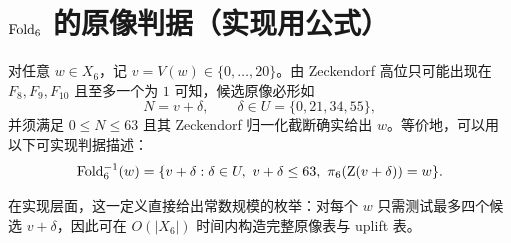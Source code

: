 
\section{$\mathrm{Fold}_6$ 的原像判据（实现用公式）}

对任意 $w\in X_6$，记 $v=V(w)\in\{0,\dots,20\}$。由 Zeckendorf 高位只可能出现在 $F_8,F_9,F_{10}$ 且至多一个为 $1$ 可知，候选原像必形如
$$
N=v+\delta,\qquad \delta\in U=\{0,21,34,55\},
$$
并须满足 $0\le N\le 63$ 且其 Zeckendorf 归一化截断确实给出 $w$。等价地，可以用以下可实现判据描述：
$$
\Fold_6^{-1}(w)=\{v+\delta:\delta\in U,\ v+\delta\le 63,\ \proj_6(\Zeck(v+\delta))=w\}.
$$

在实现层面，这一定义直接给出常数规模的枚举：对每个 $w$ 只需测试最多四个候选 $v+\delta$，因此可在 $O(|X_6|)$ 时间内构造完整原像表与 uplift 表。

